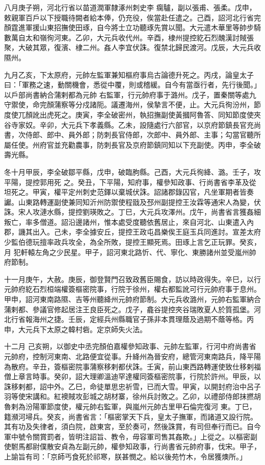 \begin{pinyinscope}
 八月庚子朔，河北行省以苗道潤軍隸涿州刺史李
 瘸驢，副以張甫、張柔。戊申，敕親軍百戶以下授職待闕者給本俸，仍充役，俟當赴任遣之。己酉，詔河北行省完顏霆進軍援山東招撫使田琢，自今將士立功聽琢先賞以聞。大元遣木華里等帥步騎數萬自太和嶺徇河東。乙卯，大元兵收代州。辛酉，棣州提控紇石烈醜漢討賊張聚，大破其眾，復濱、棣二州。姦人李宜伏誅。復禁北歸民渡河。戊辰，大元兵收隰州。



 九月乙亥，下太原府，元帥左監軍兼知樞府事烏古論德升死之。丙戌，論皇太子曰：「軍務之速，動關機會，悉從中覆，則或稽緩。自今有當亟行者，先行後聞。」以戶部尚書納合蒲剌都為元帥
 右監軍，行元帥府事于潞州。戊子，置秦關等處九守禦使，命完顏蒲察等分戍諸阨。議遷海州，侯摯言不便，止。大元兵徇汾州，節度使兀顏訛出虎死之。庚寅，李全破密州，執招撫副使黃摑阿魯答、同知節度使夾谷寺家奴。辛卯，大元兵下孝義縣。乙未，設隨處行六部官，以京府節鎮長官充尚書，次侍郎、郎中、員外郎；防刺長官侍郎，次郎中、員外郎、主事；勾當官聽所屬任使。州府官並充勸農事，防刺長官及京府節鎮同知以下充副使。丙申，李全破壽光縣。



 冬十月甲辰，李全破鄒平縣，戊申，破臨朐縣。己酉，大元兵徇絳、潞。壬子，攻平陽，提控郭用死
 之。癸丑，下平陽，知府事，權參知政事、行尚書省李革及從坦死之。甲寅，權平定州刺史范鐸以棄城伏誅。詔諸郡錄囚官，凡坐軍期者皆奏讞。山東路轉運副使兼同知沂州防禦使程戩及邳州副提控王汝霖等通宋人為變，伏誅。宋人攻漣水縣，提控劉瑛敗之。丁巳，大元兵攻澤州。戊午，尚書省言獲姦細叛亡，率多僧道。詔沿邊諸州，惟本處受度聽依舊居止，來自河北、山東遣入內郡，譏其出入。己未，李全據安丘，提控王政屯昌樂俟王庭玉兵同進討。宣差太府少監伯德玩擅率政兵攻全，為全所敗，提控王顯死焉。田琢上言乞正玩罪。癸亥，月
 犯軒轅左角之少民星。甲子，詔河東北路忻、代、寧化、東勝諸州並受嵐州帥府節制。



 十一月庚午，大赦。庚辰，御登賢門召致政舊臣賜食，訪以時政得失。辛巳，以行元帥府紇石烈桓端權簽樞密院事，行院于徐州，權右都監訛可行元帥府事于息州。甲申，詔河東南路隰、吉等州聽絳州元帥府節制。大元兵收潞州，元帥右監軍納合蒲剌都、參議官修起居注王良臣死之。戊子，龕谷提控夾谷瑞敗夏人於質孤堡。河北行省報海州之捷。壬辰，定經兵州縣職官子孫非本貫理蔭及過期不蔭等格。丙申，大元兵下太原之韓村砦。定京師失火法。



 十二月
 己亥朔，以御史中丞完顏伯嘉權參知政事、元帥左監軍，行河中府尚書省元帥府，控制河東南、北路便宜從事。升絳州為晉安府，總管河東南路兵，降平陽為散府。辛丑，簽樞密院事蒲察移剌都伏誅。壬寅，前山東西路轉運使致仕移剌福僧上章言時事。癸卯，詔大理卿溫迪罕達權同簽樞密院事，行院於許州。甲辰，以誅移剌都，詔中外。乙巳，命徒單思忠祈雪，已而大雪。甲寅，以開封府治中呂子羽等使宋講和。紅襖賊攻彭城之胡材寨，徐州兵討敗之。乙卯，以禮部侍郎抹撚胡魯剌為汾陽軍節度使，權元帥右監軍，與嵐州元帥古里甲石倫完復河
 東。丁巳，籍瀕河埽兵。癸亥，尚書省言：「樞密掌天下兵，皇太子撫軍，而諸道又設行院。其有功及失律者，須白院，啟東宮，至於奏可，然後誅賞，有司但奉行而已。自今軍中號令關賞罰者，皆明注詔旨、教令，毋容軍司售其姦欺。」上從之。以樞密副使駙馬都尉僕散安貞為左副元帥，權參知政事，行尚書省元帥府事，伐宋。甲子，上諭旨有司：「京師丐食死於祁寒，朕甚憫之。給以後苑竹木，令居獲燠所。」




\end{pinyinscope}
